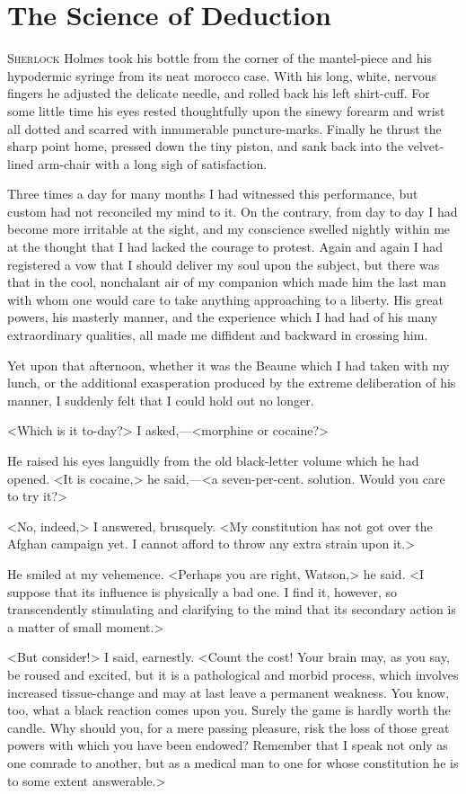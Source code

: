 \chapter{The Science of Deduction}
\lettrine{S}{herlock}  Holmes took his bottle from the corner of the mantel-piece and his hypodermic syringe from its neat morocco case. With his long, white, nervous fingers he adjusted the delicate needle, and rolled back his left shirt-cuff. For some little time his eyes rested thoughtfully upon the sinewy forearm and wrist all dotted and scarred with innumerable puncture-marks. Finally he thrust the sharp point home, pressed down the tiny piston, and sank back into the velvet-lined arm-chair with a long sigh of satisfaction.

Three times a day for many months I had witnessed this performance, but custom had not reconciled my mind to it. On the contrary, from day to day I had become more irritable at the sight, and my conscience swelled nightly within me at the thought that I had lacked the courage to protest. Again and again I had registered a vow that I should deliver my soul upon the subject, but there was that in the cool, nonchalant air of my companion which made him the last man with whom one would care to take anything approaching to a liberty. His great powers, his masterly manner, and the experience which I had had of his many extraordinary qualities, all made me diffident and backward in crossing him.

Yet upon that afternoon, whether it was the Beaune which I had taken with my lunch, or the additional exasperation produced by the extreme deliberation of his manner, I suddenly felt that I could hold out no longer.

<Which is it to-day?> I asked,—<morphine or cocaine?>

He raised his eyes languidly from the old black-letter volume which he had opened. <It is cocaine,> he said,—<a seven-per-cent. solution. Would you care to try it?>

<No, indeed,> I answered, brusquely. <My constitution has not got over the Afghan campaign yet. I cannot afford to throw any extra strain upon it.>

He smiled at my vehemence. <Perhaps you are right, Watson,> he said. <I suppose that its influence is physically a bad one. I find it, however, so transcendently stimulating and clarifying to the mind that its secondary action is a matter of small moment.>

<But consider!> I said, earnestly. <Count the cost! Your brain may, as you say, be roused and excited, but it is a pathological and morbid process, which involves increased tissue-change and may at last leave a permanent weakness. You know, too, what a black reaction comes upon you. Surely the game is hardly worth the candle. Why should you, for a mere passing pleasure, risk the loss of those great powers with which you have been endowed? Remember that I speak not only as one comrade to another, but as a medical man to one for whose constitution he is to some extent answerable.>

